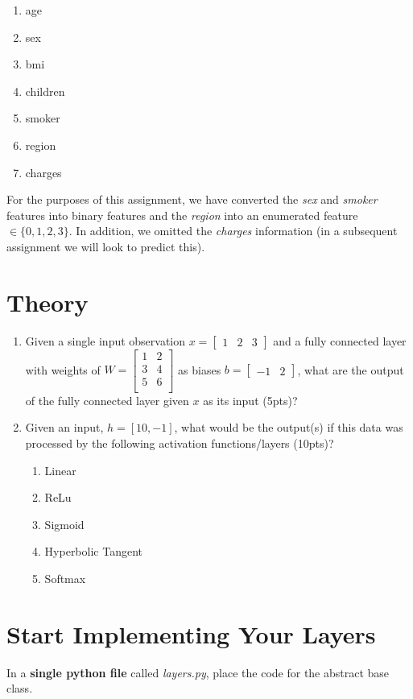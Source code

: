 \documentclass[12pt]{article}
\begin{document}
\begin{enumerate}
\item age
\item sex
\item bmi
\item children
\item smoker
\item region
\item charges
\end{enumerate}

\noindent
For the purposes of this assignment, we have converted the \emph{sex} and \emph{smoker} features into binary features and the \emph{region} into an enumerated feature $\in \{0,1,2,3\}$.   In addition, we omitted the \emph{charges} information (in a subsequent assignment we will look to predict this).


\newpage
\section{Theory}
\begin{enumerate}
\item Given a single input observation $x=\begin{bmatrix}1 & 2 &3\end{bmatrix}$ and a fully connected layer with weights of $W=\begin{bmatrix}
1 & 2\\
3 & 4\\
5 & 6\\
\end{bmatrix}$  as biases $b=\begin{bmatrix}-1 & 2\end{bmatrix}$, what are the output of the fully connected layer given $x$ as its input (5pts)?

\item Given an input, $h=[10,-1]$, what would be the output(s) if this data was processed by the following activation functions/layers (10pts)? 
\begin{enumerate}
\item Linear
\item ReLu
\item Sigmoid
\item Hyperbolic Tangent
\item Softmax
\end{enumerate}

\end{enumerate}

\newpage
\section{Start Implementing Your Layers}
In a \textbf{single python file} called \emph{layers.py}, place the code for the abstract base class.\\
\end{document}
